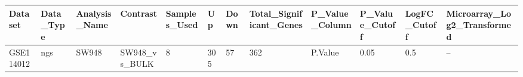 \begingroup
\tiny
\setlength{\tabcolsep}{2pt}
\renewcommand{\arraystretch}{1.18}
\begin{tabular}{@{}llllllllllll@{}}
\toprule
Dataset & Data\_Type & Analysis\_Name & Contrast & Samples\_Used & Up & Down & Total\_Significant\_Genes & P\_Value\_Column & P\_Value\_Cutoff & LogFC\_Cutoff & Microarray\_Log2\_Transformed \\
\midrule
GSE114012 & ngs & SW948 & SW948\_vs\_BULK & 8 & 305 & 57 & 362 & P.Value & 0.05 & 0.5 & -- \\
\bottomrule
\end{tabular}
\endgroup
